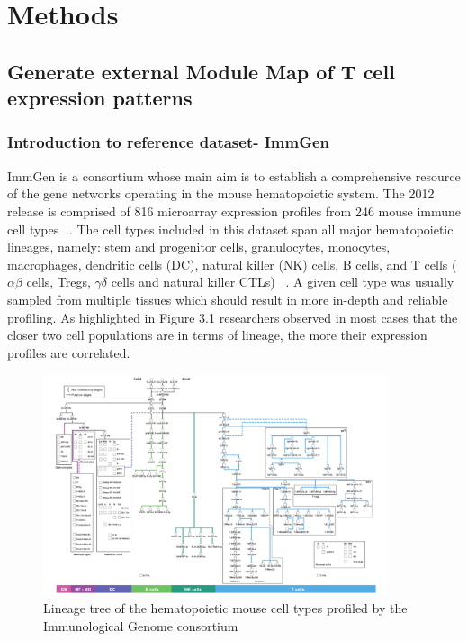 
\chapter{Methods} %

\label{Chapter3} %




\section{Generate external Module Map of T cell expression patterns}

\subsection{Introduction to reference dataset- ImmGen}

ImmGen is a consortium whose main aim is to establish a comprehensive resource of the gene networks operating in the mouse hematopoietic system. The 2012 release is comprised of 816 microarray expression profiles from 246 mouse immune cell types ~\autocite{Joj2013,Sha2013}. The cell types included in this dataset span all major hematopoietic lineages, namely: stem and progenitor cells, granulocytes, monocytes, macrophages, dendritic cells (DC), natural killer (NK) cells, B cells, and T cells ($\alpha\beta$ cells, Tregs, $\gamma\delta$ cells and natural killer CTLs) ~\autocite{Joj2013}. A given cell type was usually sampled from multiple tissues which should result in more in-depth and reliable profiling. As highlighted in Figure 3.1 researchers observed in most cases that the closer two cell populations are in terms of lineage, the more their expression profiles are correlated. 

\begin{figure}[H] 
    \centering
\includegraphics[width=0.9\textwidth]{Figures/Chapter3/immgen_lineage_tree.png}
\caption{\small{Lineage tree of the hematopoietic mouse cell types profiled by the Immunological Genome consortium ~\autocite{Joj2013}} }
    \label{fig:7}
\end{figure}

